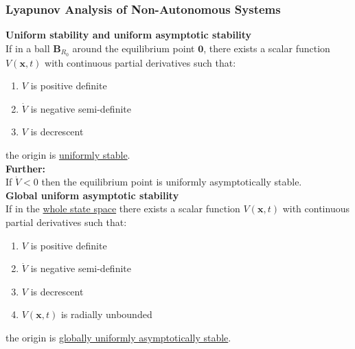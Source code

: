 \documentclass[11pt,handout]{beamer}   %
\begin{document}
\begin{frame}
\frametitle{Lyapunov Analysis of Non-Autonomous Systems}
\footnotesize
\textbf{Uniform stability and uniform asymptotic stability}\\
If in a ball $\mathbf{B}_{R_0}$ around the equilibrium point $\mathbf{0}$, there exists a scalar function $V(\mathbf{x},t)$ with continuous partial derivatives such that:
\begin{enumerate}
\item $V$ is positive definite
\item $\dot{V}$ is negative semi-definite
\item $V$ is decrescent
\end{enumerate}
the origin is \underline{uniformly stable}.\\
\vspace{6pt}
\textbf{Further:}\\
If $\dot{V} < 0$ then the equilibrium point is uniformly asymptotically stable.\\
\vspace{6pt}
\textbf{Global uniform asymptotic stability}\\
If in the \underline{whole state space} there exists a scalar function $V(\mathbf{x},t)$ with continuous partial derivatives such that:
\begin{enumerate}
\item $V$ is positive definite
\item $\dot{V}$ is negative semi-definite
\item $V$ is decrescent
\item $V(\mathbf{x},t)$ is radially unbounded
\end{enumerate}
the origin is \underline{globally uniformly asymptotically stable}.
\end{frame}
\end{document}

